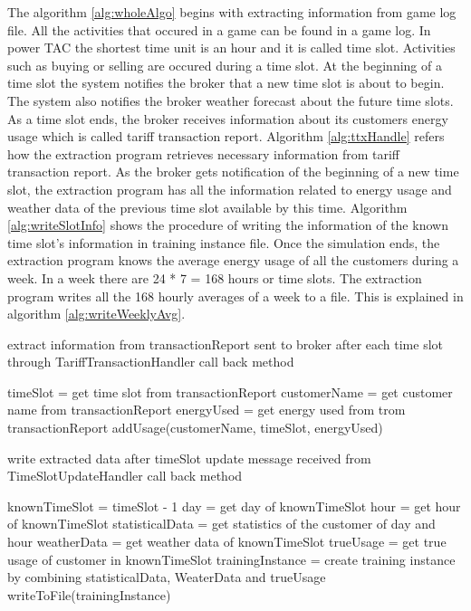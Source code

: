 The algorithm \ref{alg:wholeAlgo} begins with extracting information from game log file. All the activities that occured in a game can be found in a game log. In power TAC the shortest time unit is an hour and it is called time slot. Activities such as buying or selling are occured during a time slot. At the beginning of a time slot the system notifies the broker that a new time slot is about to begin. The system also notifies the broker weather forecast about the future time slots. As a time slot ends, the broker receives information about its customers energy usage which is called tariff transaction report. Algorithm \ref{alg:ttxHandle} refers how the extraction program retrieves necessary information from tariff transaction report. As the broker gets notification of the beginning of a new time slot, the extraction program has all the information related to energy usage and weather data of the previous time slot available by this time. Algorithm \ref{alg:writeSlotInfo} shows the procedure of writing the information of the known time slot's information in training instance file. Once the simulation ends, the extraction program knows the average energy usage of all the customers during a week. In a week there are 24 * 7 = 168 hours or time slots. The extraction program writes all the 168 hourly averages of a week to a file. This is explained in algorithm \ref{alg:writeWeeklyAvg}. 

\begin{algorithm}[!h]
\caption{extract information from transactionReport sent to broker after each time slot through TariffTransactionHandler call back method}
\begin{algorithmic} [1]
\STATE timeSlot = get time slot from transactionReport
\STATE customerName = get customer name from transactionReport
\STATE energyUsed = get energy used from trom transactionReport
\STATE addUsage(customerName, timeSlot, energyUsed)
\end{algorithmic}
 \label{alg:ttxHandle}
\end{algorithm}

\begin{algorithm} [!h]
\caption{write extracted data after timeSlot update message received from TimeSlotUpdateHandler call back method}
\begin{algorithmic} [1]
\STATE knownTimeSlot = timeSlot - 1
\STATE day = get day of knownTimeSlot
\STATE hour = get hour of knownTimeSlot
\STATE statisticalData = get statistics of the customer of day and hour
\STATE weatherData = get weather data of knownTimeSlot
\STATE trueUsage = get true usage of customer in knownTimeSlot
\STATE trainingInstance = create training instance by combining statisticalData, WeaterData and trueUsage 
\STATE writeToFile(trainingInstance)
\ENDFOR
\end{algorithmic}
\label{alg:writeSlotInfo}
\end{algorithm}

